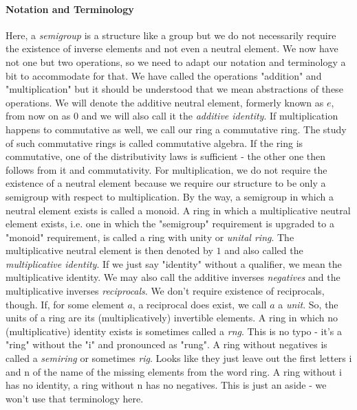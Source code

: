\paragraph{Notation and Terminology}
Here, a \emph{semigroup} is a structure like a group but we do not necessarily require the existence of inverse elements and not even a neutral element. We now have not one but two operations, so we need to adapt our notation and terminology a bit to accommodate for that. We have called the operations "addition" and "multiplication" but it should be understood that we mean abstractions of these operations. We will denote the additive neutral element, formerly known as $e$, from now on as $0$ and we will also call it the \emph{additive identity}. If multiplication happens to commutative as well, we call our ring a commutative ring. The study of such commutative rings is called commutative algebra. If the ring is commutative, one of the distributivity laws is sufficient - the other one then follows from it and commutativity. For multiplication, we do not require the existence of a neutral element because we require our structure to be only a semigroup with respect to multiplication. By the way, a semigroup in which a neutral element exists is called a monoid. A ring in which a multiplicative neutral element exists, i.e. one in which the "semigroup" requirement is upgraded to a "monoid" requirement, is called a ring with unity or \emph{unital ring}. The multiplicative neutral element is then denoted by $1$ and also called the \emph{multiplicative identity}. If we just say "identity" without a qualifier, we mean the multiplicative identity. We may also call the additive inverses \emph{negatives} and the multiplicative inverses \emph{reciprocals}. We don't require existence of reciprocals, though. If, for some element $a$, a reciprocal does exist, we call $a$ a \emph{unit}. So, the units of a ring are its (multiplicatively) invertible elements. A ring in which no (multiplicative) identity exists is sometimes called a \emph{rng}. This is no typo - it's a "ring" without the "i" and pronounced as "rung".  A ring without negatives is called a \emph{semiring} or sometimes \emph{rig}. Looks like they just leave out the first letters i and n of the name of the missing elements from the word ring. A ring without i has no identity, a ring without n has no negatives. This is just an aside - we won't use that terminology here.


